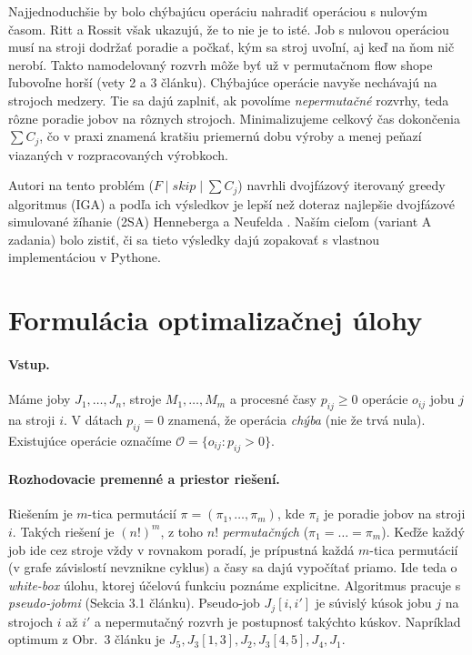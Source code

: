 \documentclass[11pt,a4paper]{article}
\newcommand{\Csum}{\sum C_j}
\begin{document}
Najjednoduchšie by bolo chýbajúcu operáciu nahradiť operáciou s nulovým časom. Ritt a Rossit
\cite{RittRossit2024} však ukazujú, že to nie je to isté. Job s nulovou operáciou musí na stroji
dodržať poradie a počkať, kým sa stroj uvoľní, aj keď na ňom nič nerobí. Takto namodelovaný
rozvrh môže byť už v permutačnom flow shope ľubovoľne horší (vety 2 a 3 článku). Chýbajúce
operácie navyše nechávajú na strojoch medzery. Tie sa dajú zaplniť, ak povolíme
\emph{nepermutačné} rozvrhy, teda rôzne poradie jobov na rôznych strojoch. Minimalizujeme
celkový čas dokončenia $\Csum$, čo v praxi znamená kratšiu priemernú dobu výroby a menej
peňazí viazaných v rozpracovaných výrobkoch.

Autori na tento problém ($F \mid \mathit{skip} \mid \Csum$) navrhli dvojfázový iterovaný greedy
algoritmus (IGA) a podľa ich výsledkov je lepší než doteraz najlepšie dvojfázové simulované
žíhanie (2SA) Henneberga a Neufelda \cite{HennebergNeufeld2016}. Naším cieľom (variant A
zadania) bolo zistiť, či sa tieto výsledky dajú zopakovať s vlastnou implementáciou v Pythone.

\section{Formulácia optimalizačnej úlohy}

\paragraph{Vstup.} Máme joby $J_1,\dots,J_n$, stroje $M_1,\dots,M_m$ a procesné časy
$p_{ij}\ge 0$ operácie $o_{ij}$ jobu $j$ na stroji $i$. V dátach $p_{ij}=0$ znamená,
že operácia \emph{chýba} (nie že trvá nula). Existujúce operácie označíme
$\mathcal{O}=\{o_{ij} : p_{ij}>0\}$.

\paragraph{Rozhodovacie premenné a priestor riešení.} Riešením je $m$-tica permutácií
$\pi=(\pi_1,\dots,\pi_m)$, kde $\pi_i$ je poradie jobov na stroji $i$. Takých riešení je
$(n!)^m$, z toho $n!$ \emph{permutačných} ($\pi_1=\dots=\pi_m$).
Keďže každý job ide cez stroje vždy v rovnakom poradí, je prípustná každá $m$-tica permutácií
(v grafe závislostí nevznikne cyklus) a časy sa dajú vypočítať priamo. Ide teda o
\emph{white-box} úlohu, ktorej účelovú funkciu poznáme explicitne. Algoritmus pracuje
s \emph{pseudo-jobmi} (Sekcia 3.1 článku). Pseudo-job $J_j[i,i']$ je súvislý kúsok jobu $j$
na strojoch $i$ až $i'$ a nepermutačný rozvrh je postupnosť takýchto kúskov. Napríklad optimum
z Obr.~3 článku je $J_5, J_3[1,3], J_2, J_3[4,5], J_4, J_1$.
\end{document}
